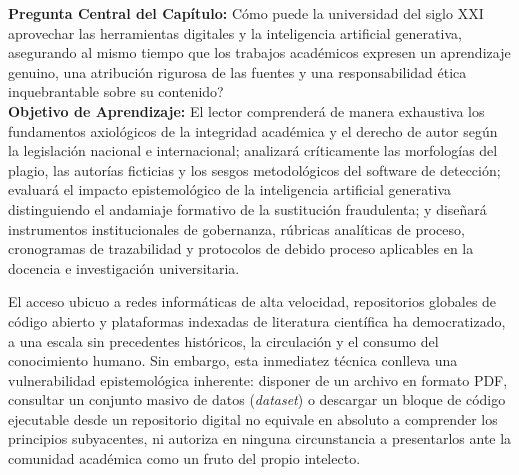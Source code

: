 \begin{cajabeige}
\textbf{Pregunta Central del Capítulo:} \textquestiondown Cómo puede la universidad del siglo XXI aprovechar las herramientas digitales y la inteligencia artificial generativa, asegurando al mismo tiempo que los trabajos académicos expresen un aprendizaje genuino, una atribución rigurosa de las fuentes y una responsabilidad ética inquebrantable sobre su contenido?\\[0.3cm]
\textbf{Objetivo de Aprendizaje:} El lector comprenderá de manera exhaustiva los fundamentos axiológicos de la integridad académica y el derecho de autor según la legislación nacional e internacional; analizará críticamente las morfologías del plagio, las autorías ficticias y los sesgos metodológicos del software de detección; evaluará el impacto epistemológico de la inteligencia artificial generativa distinguiendo el andamiaje formativo de la sustitución fraudulenta; y diseñará instrumentos institucionales de gobernanza, rúbricas analíticas de proceso, cronogramas de trazabilidad y protocolos de debido proceso aplicables en la docencia e investigación universitaria.
\end{cajabeige}


\vspace{0.3cm}

El acceso ubicuo a redes informáticas de alta velocidad, repositorios globales de código abierto y plataformas indexadas de literatura científica ha democratizado, a una escala sin precedentes históricos, la circulación y el consumo del conocimiento humano. Sin embargo, esta inmediatez técnica conlleva una vulnerabilidad epistemológica inherente: disponer de un archivo en formato PDF, consultar un conjunto masivo de datos (\textit{dataset}) o descargar un bloque de código ejecutable desde un repositorio digital no equivale en absoluto a comprender los principios subyacentes, ni autoriza en ninguna circunstancia a presentarlos ante la comunidad académica como un fruto del propio intelecto.

